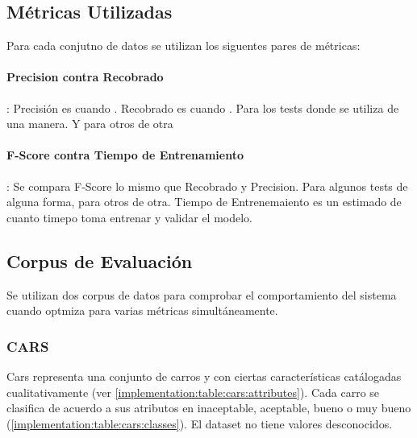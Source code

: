 \subsection{M\'etricas Utilizadas}

Para cada conjutno de datos se utilizan los siguentes pares de m\'etricas:

\paragraph{Precision contra Recobrado}: Precisi\'on es cuando . Recobrado es cuando . Para los tests donde se utiliza de una manera. Y para otros de otra

\paragraph{F-Score contra Tiempo de Entrenamiento}: Se compara F-Score lo mismo que Recobrado y Precision. Para algunos tests de alguna forma, para otros de otra. Tiempo de Entrenemaiento es un estimado de cuanto timepo toma entrenar y validar el modelo.

\subsection{Corpus de Evaluaci\'on}

Se utilizan dos corpus de datos para comprobar el comportamiento del sistema cuando optmiza para varias m\'etricas simult\'aneamente.

\subsubsection{CARS}
Cars representa una conjunto de carros y con ciertas caracter\'isticas cat\'alogadas cualitativamente (ver \ref{implementation:table:cars:attributes}). Cada carro se clasifica de acuerdo a sus atributos  en inaceptable, aceptable, bueno o muy bueno (\ref{implementation:table:cars:classes}). El dataset no tiene valores desconocidos.

